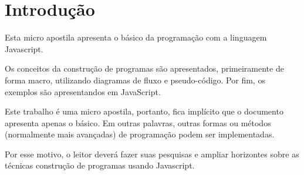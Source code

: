 \section{Introdução}
\label{intro}

Esta micro apostila apresenta o básico da programação com a linguagem Javascript. 

Os conceitos da construção de programas são apresentados, primeiramente de forma macro, utilizando diagramas de fluxo e pseudo-código. Por fim, os exemplos são apresentandos em JavaScript.

Este trabalho é uma micro apostila, portanto, fica implícito que o documento apresenta apenas o básico. Em outras palavras, outras formas ou métodos (normalmente mais avançadas) de programação podem ser implementadas. 

Por esse motivo, o leitor deverá fazer suas pesquisas e ampliar horizontes sobre as técnicas construção de programas usando Javascript.
